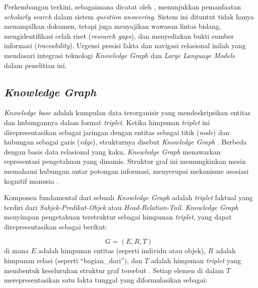 Perkembangan terkini, sebagaimana dicatat oleh \citet{gupta2024comprehensivesurveyretrievalaugmentedgeneration}, menunjukkan pemanfaatan \textit{scholarly search} dalam sistem \textit{question answering}. Sistem ini dituntut tidak hanya menampilkan dokumen, tetapi juga menyajikan wawasan lintas bidang, mengidentifikasi celah riset (\textit{research gaps}), dan menyediakan bukti sumber informasi (\textit{traceability}). Urgensi presisi fakta dan navigasi relasional inilah yang mendasari integrasi teknologi \textit{Knowledge Graph} dan \textit{Large Language Models} dalam penelitian ini.

\subsection{\textit{Knowledge Graph}}

\textit{Knowledge base} adalah kumpulan data terorganisir yang mendeskripsikan entitas dan hubungannya dalam format \textit{triplet}. Ketika himpunan \textit{triplet} ini direpresentasikan sebagai jaringan dengan entitas sebagai titik (\textit{node}) dan hubungan sebagai garis (\textit{edge}), strukturnya disebut \textit{Knowledge Graph} \citep{mondal2021end}. Berbeda dengan basis data relasional yang kaku, \textit{Knowledge Graph} menawarkan representasi pengetahuan yang dinamis. Struktur graf ini memungkinkan mesin memahami hubungan antar potongan informasi, menyerupai mekanisme asosiasi kognitif manusia \citep{cheng2025humancognitioninspiredrag}.

Komponen fundamental dari sebuah \textit{Knowledge Graph} adalah \textit{triplet} faktual yang terdiri dari \textit{Subjek-Predikat-Objek} atau \textit{Head-Relation-Tail}. \textit{Knowledge Graph} menyimpan pengetahuan terstruktur sebagai himpunan \textit{triplet}, yang dapat direpresentasikan sebagai berikut:

\begin{equation}
    G = (E, R, T)
    \label{eq:kg-definition}
\end{equation}
di mana $E$ adalah himpunan entitas (seperti individu atau objek), $R$ adalah himpunan relasi (seperti ``bagian\_dari''), dan $T$ adalah himpunan \textit{triplet} yang membentuk keseluruhan struktur graf tersebut \citep{Hogan_2021}. Setiap elemen di dalam $T$ merepresentasikan satu fakta tunggal yang diformulasikan sebagai:

